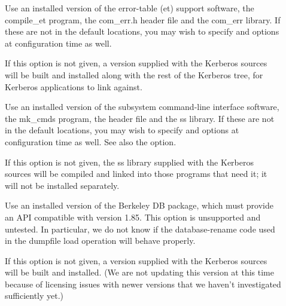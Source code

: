 \documentclass[letterpaper,10pt,english]{sphinxmanual}
\begin{document}
\begin{description}
\item[{\sphinxstylestrong{-}}] \leavevmode
Use an installed version of the error-table (et) support software,
the compile\_et program, the com\_err.h header file and the com\_err
library.  If these are not in the default locations, you may wish
to specify  and
 options at configuration time as
well.

If this option is not given, a version supplied with the Kerberos
sources will be built and installed along with the rest of the
Kerberos tree, for Kerberos applications to link against.

\item[{\sphinxstylestrong{-}}] \leavevmode
Use an installed version of the subsystem command-line interface
software, the mk\_cmds program, the  header file and the
ss library.  If these are not in the default locations, you may
wish to specify  and
 options at configuration time as
well.  See also the  option.

If this option is not given, the ss library supplied with the
Kerberos sources will be compiled and linked into those programs
that need it; it will not be installed separately.

\item[{\sphinxstylestrong{-}}] \leavevmode
Use an installed version of the Berkeley DB package, which must
provide an API compatible with version 1.85.  This option is
unsupported and untested.  In particular, we do not know if the
database-rename code used in the dumpfile load operation will
behave properly.

If this option is not given, a version supplied with the Kerberos
sources will be built and installed.  (We are not updating this
version at this time because of licensing issues with newer
versions that we haven’t investigated sufficiently yet.)

\end{description}
\end{document}
